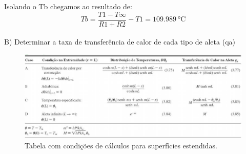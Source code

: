 Isolando o Tb chegamos ao resultado de:
\begin{equation}
    {Tb}={\frac{T1 -T\infty}{{R1}+{R2}}}-{T1} = \SI{109,989}{\degreeCelsius}
\end{equation}
\\
{\ABNTEXchapterfont\Large{B) Determinar a taxa de transferência de calor de cada tipo de aleta (qa)}}

\begin{figure}[h]
    \centering
    \caption{Tabela com condições de cálculos para superfícies estendidas.}
    \label{fig:tabelaCasosCalc}
    \includegraphics[width=15cm]{figuras/tabelaCasosCalc.jpg}
\end{figure}

